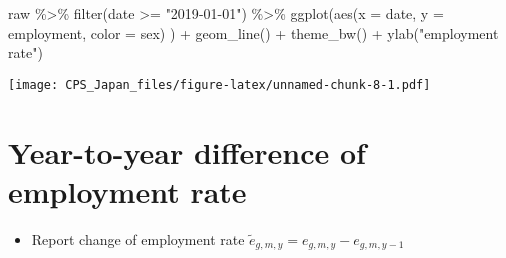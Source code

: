 \documentclass[
]{book}
\newenvironment{Shaded}{\begin{snugshade}}{\end{snugshade}}
\newcommand{\AttributeTok}[1]{\textcolor[rgb]{0.77,0.63,0.00}{#1}}
\newcommand{\FunctionTok}[1]{\textcolor[rgb]{0.00,0.00,0.00}{#1}}
\newcommand{\NormalTok}[1]{#1}
\newcommand{\SpecialCharTok}[1]{\textcolor[rgb]{0.00,0.00,0.00}{#1}}
\newcommand{\StringTok}[1]{\textcolor[rgb]{0.31,0.60,0.02}{#1}}
\providecommand{\tightlist}{%
  \setlength{\itemsep}{0pt}\setlength{\parskip}{0pt}}
\begin{document}
\begin{Shaded}
\begin{Highlighting}[]
\NormalTok{raw }\SpecialCharTok{\%\textgreater{}\%}
  \FunctionTok{filter}\NormalTok{(date }\SpecialCharTok{\textgreater{}=} \StringTok{"2019{-}01{-}01"}\NormalTok{) }\SpecialCharTok{\%\textgreater{}\%}
  \FunctionTok{ggplot}\NormalTok{(}\FunctionTok{aes}\NormalTok{(}\AttributeTok{x =}\NormalTok{ date,}
             \AttributeTok{y =}\NormalTok{ employment,}
             \AttributeTok{color =}\NormalTok{ sex)}
\NormalTok{         ) }\SpecialCharTok{+}
  \FunctionTok{geom\_line}\NormalTok{() }\SpecialCharTok{+}
  \FunctionTok{theme\_bw}\NormalTok{() }\SpecialCharTok{+}
  \FunctionTok{ylab}\NormalTok{(}\StringTok{"employment rate"}\NormalTok{)}
\end{Highlighting}
\end{Shaded}

\texttt{[image: CPS\_Japan\_files/figure-latex/unnamed-chunk-8-1.pdf]}

\hypertarget{year-to-year-difference-of-employment-rate-1}{%
\section{Year-to-year difference of employment rate}\label{year-to-year-difference-of-employment-rate-1}}

\begin{itemize}
\tightlist
\item
  Report change of employment rate \(\tilde e_{g,m,y}=e_{g,m,y}-e_{g,m,y-1}\)
\end{itemize}
\end{document}
